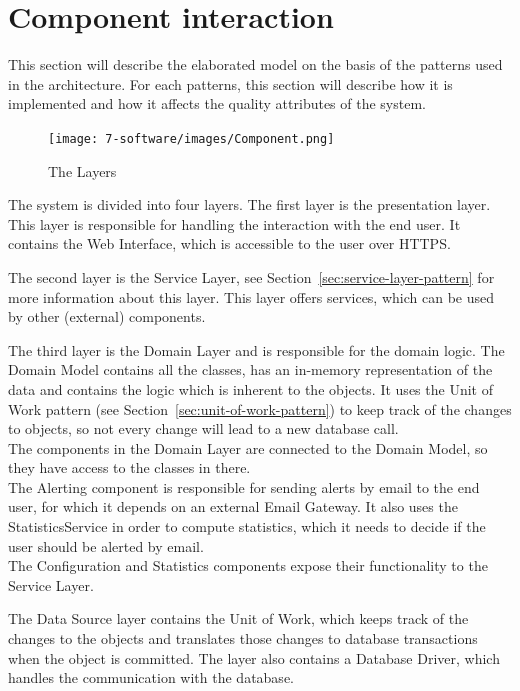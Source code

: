 \section{Component interaction}
This section will describe the elaborated model on the basis of the patterns used in the architecture. For each patterns, this section will describe how it is implemented and how it affects the quality attributes of the system.

\begin{figure}[H]
\centering
\texttt{[image: 7-software/images/Component.png]}
\caption{The Layers}
\label{fig:layers}
\end{figure}
The system is divided into four layers. The first layer is the presentation layer. This layer is responsible for handling the interaction with the end user. It contains the Web Interface, which is accessible to the user over HTTPS.

The second layer is the Service Layer, see Section~\ref{sec:service-layer-pattern} for more information about this layer. This layer offers services, which can be used by other (external) components.

The third layer is the Domain Layer and is responsible for the domain logic. The Domain Model contains all the classes, has an in-memory representation of the data and contains the logic which is inherent to the objects.
It uses the Unit of Work pattern (see Section~\ref{sec:unit-of-work-pattern}) to keep track of the changes to objects, so not every change will lead to a new database call. \\
The components in the Domain Layer are connected to the Domain Model, so they have access to the classes in there. \\
The Alerting component is responsible for sending alerts by email to the end user, for which it depends on an external Email Gateway. It also uses the StatisticsService in order to compute statistics, which it needs to decide if the user should be alerted by email. \\
The Configuration and Statistics components expose their functionality to the Service Layer.

The Data Source layer contains the Unit of Work, which keeps track of the changes to the objects and translates those changes to database transactions when the object is committed. The layer also contains a Database Driver, which handles the communication with the database.




